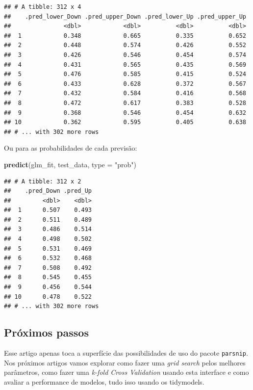 \documentclass[
]{article}
\newenvironment{Shaded}{\begin{snugshade}}{\end{snugshade}}
\newcommand{\DataTypeTok}[1]{\textcolor[rgb]{0.13,0.29,0.53}{#1}}
\newcommand{\KeywordTok}[1]{\textcolor[rgb]{0.13,0.29,0.53}{\textbf{#1}}}
\newcommand{\NormalTok}[1]{#1}
\newcommand{\StringTok}[1]{\textcolor[rgb]{0.31,0.60,0.02}{#1}}
\begin{document}
\begin{verbatim}
## # A tibble: 312 x 4
##    .pred_lower_Down .pred_upper_Down .pred_lower_Up .pred_upper_Up
##               <dbl>            <dbl>          <dbl>          <dbl>
##  1            0.348            0.665          0.335          0.652
##  2            0.448            0.574          0.426          0.552
##  3            0.426            0.546          0.454          0.574
##  4            0.431            0.565          0.435          0.569
##  5            0.476            0.585          0.415          0.524
##  6            0.433            0.628          0.372          0.567
##  7            0.432            0.584          0.416          0.568
##  8            0.472            0.617          0.383          0.528
##  9            0.368            0.546          0.454          0.632
## 10            0.362            0.595          0.405          0.638
## # ... with 302 more rows
\end{verbatim}

Ou para as probabilidades de cada previsão:

\begin{Shaded}
\begin{Highlighting}[]
\KeywordTok{predict}\NormalTok{(glm_fit, test_data, }\DataTypeTok{type =} \StringTok{"prob"}\NormalTok{)}
\end{Highlighting}
\end{Shaded}

\begin{verbatim}
## # A tibble: 312 x 2
##    .pred_Down .pred_Up
##         <dbl>    <dbl>
##  1      0.507    0.493
##  2      0.511    0.489
##  3      0.486    0.514
##  4      0.498    0.502
##  5      0.531    0.469
##  6      0.532    0.468
##  7      0.508    0.492
##  8      0.545    0.455
##  9      0.456    0.544
## 10      0.478    0.522
## # ... with 302 more rows
\end{verbatim}

\hypertarget{pruxf3ximos-passos}{%
\subsection{Próximos passos}\label{pruxf3ximos-passos}}

Esse artigo apenas toca a superfície das possibilidades de uso do pacote
\texttt{parsnip}. Nos próximos artigos vamos explorar como fazer uma
\emph{grid search} pelos melhores parâmetros, como fazer uma
\emph{k-fold Cross Validation} usando esta interface e como avaliar a
performance de modelos, tudo isso usando os tidymodels.
\end{document}
